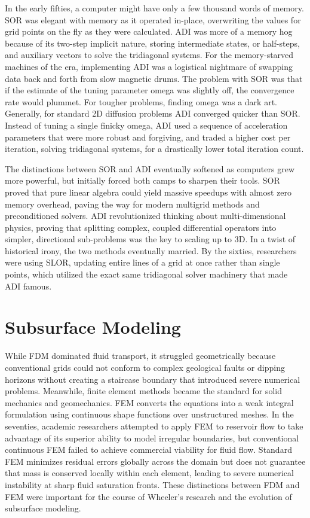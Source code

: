 In the early fifties, a computer might have only a few thousand words of memory. SOR was elegant with memory as it operated in-place, overwriting the values for grid points on the fly as they were calculated. ADI was more of a memory hog because of its two-step implicit nature, storing intermediate states, or half-steps, and auxiliary vectors to solve the tridiagonal systems. For the memory-starved machines of the era, implementing ADI was a logistical nightmare of swapping data back and forth from slow magnetic drums. The problem with SOR was that if the estimate of the tuning parameter omega was slightly off, the convergence rate would plummet. For tougher problems, finding omega was a dark art. Generally, for standard 2D diffusion problems ADI converged quicker than SOR. Instead of tuning a single finicky omega, ADI used a sequence of acceleration parameters that were more robust and forgiving, and traded a higher cost per iteration, solving tridiagonal systems, for a drastically lower total iteration count.

The distinctions between SOR and ADI eventually softened as computers grew more powerful, but initially forced both camps to sharpen their tools. SOR proved that pure linear algebra could yield massive speedups with almost zero memory overhead, paving the way for modern multigrid methods and preconditioned solvers. ADI revolutionized thinking about multi-dimensional physics, proving that splitting complex, coupled differential operators into simpler, directional sub-problems was the key to scaling up to 3D. In a twist of historical irony, the two methods eventually married. By the sixties, researchers were using SLOR, updating entire lines of a grid at once rather than single points, which utilized the exact same tridiagonal solver machinery that made ADI famous.

\section{Subsurface Modeling}

While FDM dominated fluid transport, it struggled geometrically because conventional grids could not conform to complex geological faults or dipping horizons without creating a staircase boundary that introduced severe numerical problems. Meanwhile, finite element methods became the standard for solid mechanics and geomechanics. FEM converts the equations into a weak integral formulation using continuous shape functions over unstructured meshes. In the seventies, academic researchers attempted to apply FEM to reservoir flow to take advantage of its superior ability to model irregular boundaries, but conventional continuous FEM failed to achieve commercial viability for fluid flow. Standard FEM minimizes residual errors globally across the domain but does not guarantee that mass is conserved locally within each element, leading to severe numerical instability at sharp fluid saturation fronts. These distinctions between FDM and FEM were important for the course of Wheeler’s research and the evolution of subsurface modeling.

